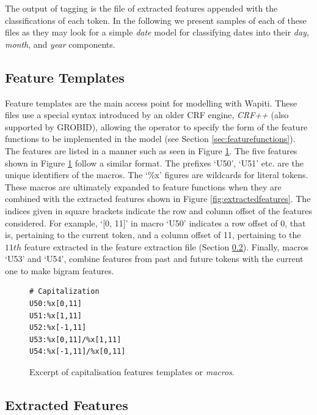 The output of tagging is the file of extracted features appended with the classifications of each token. In the following we present samples of each of these files as they may look for a simple \emph{date} model for classifying dates into their \emph{day}, \emph{month}, and \emph{year} components.

\subsection{Feature Templates}
\label{subsec:featuretemplates}

Feature templates are the main access point for modelling with Wapiti. These files use a special syntax introduced by an older CRF engine, \emph{CRF++} (also supported by GROBID), allowing the operator to specify the form of the feature functions to be implemented in the model (see Section \ref{sec:featurefunctions}). The features are listed in a manner such as seen in Figure \ref{fig:featuretemplatefile}. The five features shown in Figure \ref{fig:featuretemplatefile} follow a similar format. The prefixes `U50', `U51' etc. are the unique identifiers of the macros. The `\%x' figures are wildcards for literal tokens. These macros are ultimately expanded to feature functions when they are combined with the extracted features shown in Figure \ref{fig:extractedfeatures}. The indices given in square brackets indicate the row and column offset of the features considered. For example, `[0, 11]' in macro `U50' indicates a row offset of $0$, that is, pertaining to the current token, and a column offset of 11, pertaining to the $11th$ feature extracted in the feature extraction file (Section \ref{subsec:extractedfeatures}). Finally, macros `U53' and `U54', combine features from past and future tokens with the current one to make bigram features.

\begin{figure}
\centering
\begin{BVerbatim}
# Capitalization
U50:%x[0,11]
U51:%x[1,11]
U52:%x[-1,11]
U53:%x[0,11]/%x[1,11]
U54:%x[-1,11]/%x[0,11]
\end{BVerbatim}
\caption{Excerpt of capitalisation features templates or \emph{macros}.}
\label{fig:featuretemplatefile}
\end{figure}

\subsection{Extracted Features}
\label{subsec:extractedfeatures}

